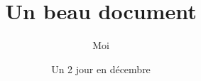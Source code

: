 \documentclass[a4paper, twoside, onecolumn, 10pt]{book}
\title{Un beau document}
\author{Moi}
\date{Un 2 jour en décembre}
\begin{document}
\maketitle
\dominitoc %
\tableofcontents

\frontmatter

\mainmatter %


\appendix %

\end{document}
